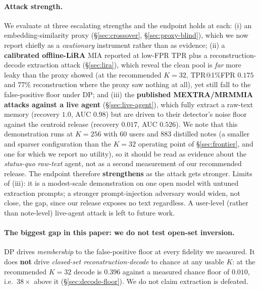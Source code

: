 \documentclass[pdflatex,sn-mathphys-num,12pt]{sn-jnl}
\theoremstyle{thmstyleone}%
\theoremstyle{thmstyletwo}%
\theoremstyle{thmstylethree}%
\newcommand{\secref}[1]{\S\ref{#1}}
\begin{document}
\paragraph{Attack strength.} We evaluate at three escalating strengths and the endpoint holds at
each: (i) an embedding-similarity proxy (\secref{sec:crossover}, \secref{sec:proxy-blind}), which
we now report chiefly as a \emph{cautionary} instrument rather than as evidence; (ii) a
\textbf{calibrated offline-LiRA} MIA reported at low-FPR TPR plus a reconstruction-decode
extraction attack (\secref{sec:lira}), which reveal the clean pool is \emph{far} more leaky than
the proxy showed (at the recommended $K = 32$, TPR@1\%FPR $0.175$ and 77\% reconstruction where
the proxy saw nothing at all), yet still fall to the false-positive floor under DP; and (iii) the
\textbf{published MEXTRA/MRMMIA attacks against a live agent} (\secref{sec:live-agent}), which
fully extract a raw-text memory (recovery $1.0$, AUC $0.98$) but are driven to their detector's noise
floor against the centroid release (recovery $0.017$, AUC $0.526$). We note that this demonstration runs
at $K = 256$ with 60 users and 883 distilled notes (a smaller and sparser configuration than the
$K = 32$ operating point of \secref{sec:frontier}, and one for which we report no utility), so it
should be read as evidence about the \emph{status-quo raw-text} agent, not as a second measurement of
our recommended release. The endpoint therefore \textbf{strengthens} as the attack gets stronger.
Limits of (iii): it is a modest-scale demonstration on one open model with untuned extraction
prompts; a stronger prompt-injection adversary would widen, not close, the gap, since our release
exposes no text regardless. A user-level (rather than note-level) live-agent attack is left to
future work.

\paragraph{The biggest gap in this paper: we do not test open-set inversion.} DP drives
\emph{membership} to the false-positive floor at every fidelity we measured. It does
\textbf{not} drive \emph{closed-set reconstruction-decode} to chance at any usable $K$: at the
recommended $K = 32$ decode is $0.396$ against a measured chance floor of $0.010$, i.e.\
$38\times$ above it (\secref{sec:decode-floor}). We do not claim extraction is defeated.
\end{document}
